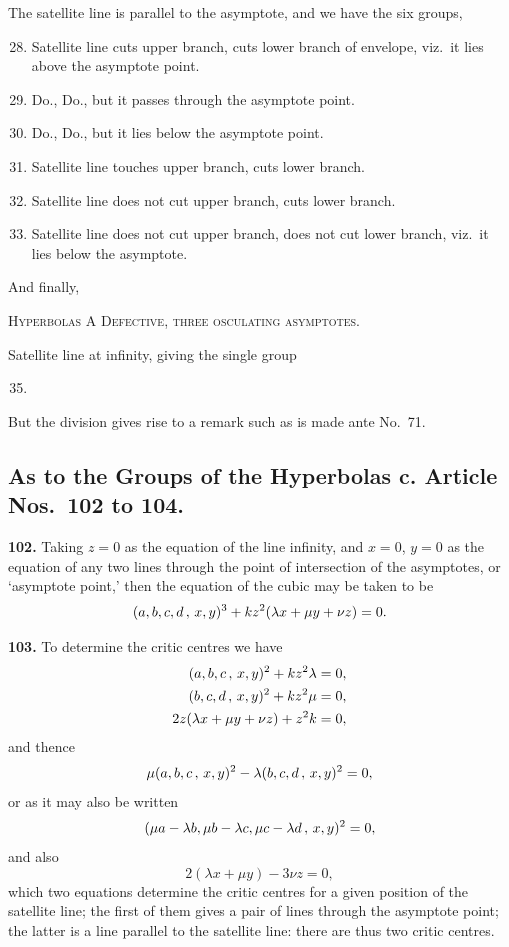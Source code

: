\documentclass[11pt,a4paper]{article}
\theoremstyle{plain}
\begin{document}
The satellite line is parallel to the asymptote, and we have the six groups,
\begin{enumerate}[label=\textsc{\Roman*.},nosep]
\setcounter{enumi}{27}
\item Satellite line cuts upper branch, cuts lower branch of envelope, viz.\ it lies above the asymptote point.
\item Do., Do., but it passes through the asymptote point.
\item Do., Do., but it lies below the asymptote point.
\item Satellite line touches upper branch, cuts lower branch.
\item Satellite line does not cut upper branch, cuts lower branch.
\item Satellite line does not cut upper branch, does not cut lower branch, viz.\ it lies below the asymptote.
\end{enumerate}

And finally,

\textsc{Hyperbolas A Defective, three osculating asymptotes.}

Satellite line at infinity, giving the single group
\begin{enumerate}[label=\textsc{\Roman*.},nosep]
\setcounter{enumi}{34}
\item
\end{enumerate}

But the division gives rise to a remark such as is made ante No.~71.

\subsection*{As to the Groups of the Hyperbolas c. Article Nos.\ 102 to 104.}

\noindent\textbf{102.} Taking $z=0$ as the equation of the line infinity, and $x = 0$, $y=0$ as the equation of any two lines through the point of intersection of the asymptotes, or `asymptote point,' then the equation of the cubic may be taken to be
\[
(a, b, c, d \, \char`\,\, x, y)^3 + kz^2(\lambda x + \mu y + \nu z) = 0.
\]

\noindent\textbf{103.} To determine the critic centres we have
\begin{align*}
(a, b, c \, \char`\,\, x, y)^2 + kz^2\lambda &= 0,\\
(b, c, d \, \char`\,\, x, y)^2 + kz^2\mu &= 0,\\
2z(\lambda x + \mu y + \nu z) + z^2k &= 0,
\end{align*}
and thence
\[
\mu(a, b, c \, \char`\,\, x, y)^2 - \lambda(b, c, d \, \char`\,\, x, y)^2 = 0,
\]
or as it may also be written
\[
(\mu a - \lambda b, \mu b - \lambda c, \mu c - \lambda d \, \char`\,\, x, y)^2 = 0,
\]
and also
\[
2(\lambda x + \mu y) - 3\nu z = 0,
\]
which two equations determine the critic centres for a given position of the satellite line; the first of them gives a pair of lines through the asymptote point; the latter is a line parallel to the satellite line: there are thus two critic centres.
\end{document}
